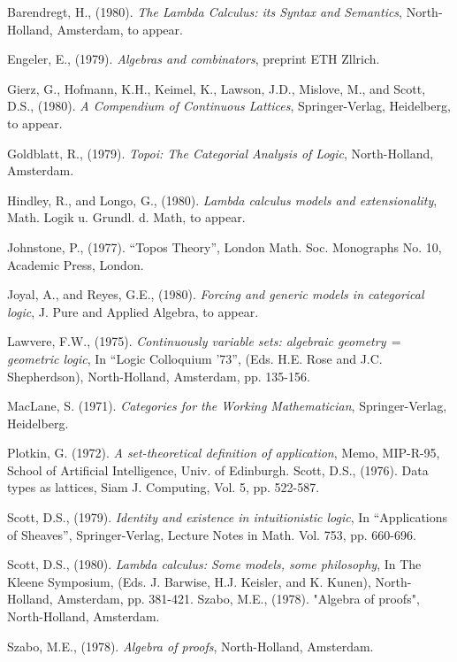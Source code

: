 \begin{thebibliography}{86}

 Barendregt, H., (1980). {\it The Lambda Calculus: its Syntax and Semantics}, North-Holland, Amsterdam, to appear.

 Engeler, E., (1979).  {\it Algebras and combinators}, preprint ETH Zllrich.

 Gierz, G., Hofmann, K.H., Keimel, K., Lawson, J.D., Mislove, M., and Scott, D.S., (1980). {\it A Compendium of Continuous Lattices}, Springer-Verlag, Heidelberg, to appear.

 Goldblatt, R., (1979). {\it Topoi: The Categorial Analysis of Logic}, North-Holland, Amsterdam.

 Hindley, R., and Longo, G., (1980). {\it Lambda calculus models and extensionality}, Math. Logik u. Grundl. d. Math, to appear.

Johnstone, P., (1977). ``Topos Theory'', London Math. Soc.
Monographs No. 10, Academic Press, London.

 Joyal, A., and Reyes, G.E., (1980). {\it Forcing and generic models in categorical logic}, J. Pure and Applied Algebra, to appear.

 Lawvere, F.W., (1975). {\it Continuously variable sets: algebraic geometry$\,=\,$geometric logic}, In ``Logic Colloquium '73'', (Eds. H.E. Rose and J.C. Shepherdson), North-Holland, Amsterdam, pp. 135-156.

 MacLane, S. (1971). {\it Categories for the Working Mathematician}, Springer-Verlag, Heidelberg.

 Plotkin, G. (1972). {\it A set-theoretical definition of application}, Memo, MIP-R-95, School of Artificial Intelligence, Univ. of Edinburgh.
Scott, D.S., (1976). Data types as lattices, Siam J. Computing,
Vol. 5, pp. 522-587.

 Scott, D.S., (1979). {\it Identity and existence in intuitionistic logic}, In ``Applications of Sheaves'', Springer-Verlag, Lecture Notes in Math. Vol. 753, pp. 660-696.

 Scott, D.S., (1980). {\it Lambda calculus: Some models, some philosophy}, In The Kleene Symposium, (Eds. J. Barwise,
H.J. Keisler, and K. Kunen), North-Holland, Amsterdam, pp. 381-421.
Szabo, M.E., (1978). "Algebra of proofs", North-Holland, Amsterdam.

 Szabo, M.E., (1978). {\it Algebra of proofs}, North-Holland, Amsterdam.

\end{thebibliography}
